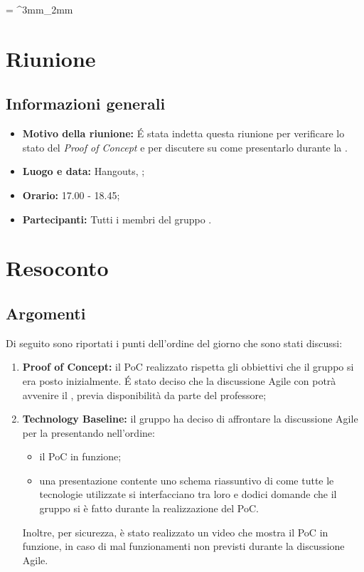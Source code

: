 \documentclass[VER-2018-03-02.tex]{subfiles}
\begin{document}
\tabulinesep = ^3mm_2mm
\chapter{Riunione}
\section{Informazioni generali}
\begin{itemize}
	\item \textbf{Motivo della riunione:} \'{E} stata indetta questa riunione per verificare lo stato del \textit{Proof of Concept} e per discutere su come presentarlo durante la \tb.
	\item \textbf{Luogo e data:} Hangouts, ;
	\item \textbf{Orario:} 17.00 - 18.45;
	\item \textbf{Partecipanti:} Tutti i membri del gruppo \gruppo.
\end{itemize}


\chapter{Resoconto}

\section{Argomenti}
Di seguito sono riportati i punti dell'ordine del giorno che sono stati discussi:
\begin{enumerate}
	\item \textbf{Proof of Concept:} il PoC realizzato rispetta gli obbiettivi che il gruppo si era posto inizialmente. \'{E} stato deciso che la discussione Agile con \Cardin potrà avvenire il , previa disponibilità da parte del professore;
	\item \textbf{Technology Baseline:} il gruppo ha deciso di affrontare la discussione Agile per la \tb presentando nell'ordine:
	\begin{itemize}
		\item il PoC in funzione;
		\item una presentazione contente uno schema riassuntivo di come tutte le tecnologie utilizzate si interfacciano tra loro e dodici domande che il gruppo si è fatto durante la realizzazione del PoC.
	\end{itemize}
	 Inoltre, per sicurezza, è stato realizzato un video che mostra il PoC in funzione, in caso di mal funzionamenti non previsti durante la discussione Agile.
\end{enumerate}
\end{document}
